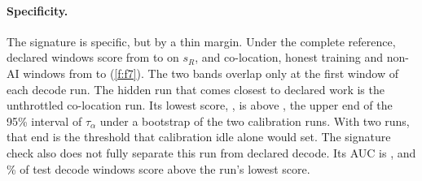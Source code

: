 \paragraph{Specificity.} The signature is specific, but by a thin margin. Under the complete reference, declared
windows score from \DeclBandLo{} to \DeclBandHi{} on $s_R$, and co-location, honest
training and non-AI windows from \HidBandLo{} to \HidBandHi{} (\cref{f:f7}). The two
bands overlap only at the first window of each decode run. The hidden run that comes
closest to declared work is the unthrottled co-location run. Its lowest score,
\RoneUnpacedMin, is \RoneMargin{} above \TauRoneHi, the upper end of the 95\% interval
of $\tau_\alpha$ under a bootstrap of the two calibration runs. With two runs, that end
is the threshold that calibration idle alone would set. The signature check also
does not fully separate this run from declared decode. Its AUC is \RoneAucDecode, and
\RoneDecodeAboveMin\% of test decode windows score above the run's lowest score.
